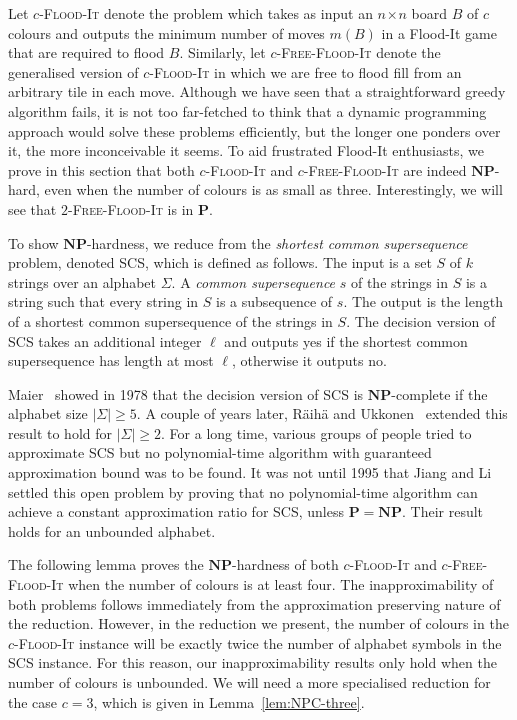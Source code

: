 \documentclass[a4paper,11pt]{llncs}
\newcounter{l}
\renewcommand{\geq}{\geqslant}
\newcommand{\Ptime}{\ensuremath{\mathbf{P}}}
\newcommand{\NPtime}{\ensuremath{\mathbf{NP}}}
\newcommand{\Coloroid}[1]{$#1$-\textsc{Flood-It}}
\newcommand{\ColoroidFree}[1]{$#1$-\textsc{Free-Flood-It}}
\newcommand{\SCS}{\textsc{SCS}}
\newcommand{\recdim}[2]{$#1$$\mspace{1mu}$$\times$$\mspace{1mu}$$#2$}
\begin{document}
Let \Coloroid{c} denote the problem which takes as input an \recdim{n}{n} board $B$ of $c$ colours and outputs the minimum number of moves $m(B)$ in a Flood-It game that are required to flood $B$. Similarly, let \ColoroidFree{c} denote the generalised version of \Coloroid{c} in which we are free to flood fill from an arbitrary tile in each move. Although we have seen that a straightforward greedy algorithm fails, it is not too far-fetched to think that a dynamic programming approach would solve these problems efficiently, but the longer one ponders over it, the more inconceivable it seems. To aid frustrated Flood-It enthusiasts, we prove in this section that both \Coloroid{c} and \ColoroidFree{c} are indeed \NPtime-hard, even when the number of colours is as small as three. Interestingly, we will see that \ColoroidFree{2} is in \Ptime.

To show \NPtime-hardness, we reduce from the \emph{shortest common supersequence} problem, denoted \SCS{}, which is defined as follows. The input is a set $S$ of $k$ strings over an alphabet $\Sigma$. A \emph{common supersequence} $s$ of the strings in $S$ is a string such that every string in $S$ is a subsequence of $s$. The output is the length of a shortest common supersequence of the strings in $S$. The decision version of \SCS{} takes an additional integer $\ell$ and outputs yes if the shortest common supersequence has length at most $\ell$, otherwise it outputs no.

Maier~\cite{Mai1978:SCS} showed in 1978 that the decision version of \SCS{} is \NPtime-complete if the alphabet size $|\Sigma|\geq 5$. A couple of years later, R\"aih\"a and Ukkonen~\cite{RU1981:SCS} extended this result to hold for $|\Sigma|\geq 2$. For a long time, various groups of people tried to approximate \SCS{} but no polynomial-time algorithm with guaranteed approximation bound was to be found. It was not until 1995 that Jiang and Li~\cite{JM1995:SCS} settled this open problem by proving that no polynomial-time algorithm can achieve a constant approximation ratio for \SCS{}, unless $\Ptime=\NPtime$. Their result holds for an unbounded alphabet.

The following lemma proves the \NPtime-hardness of both \Coloroid{c} and \ColoroidFree{c} when the number of colours is at least four. The inapproximability of both problems follows immediately from the approximation preserving nature of the reduction. However, in the reduction we present, the number of colours in the \Coloroid{c} instance will be exactly twice the number of alphabet symbols in the \SCS{} instance. For this reason, our inapproximability results only hold when the number of colours is unbounded. We will need a more specialised reduction for the case $c=3$, which is given in Lemma~\ref{lem:NPC-three}.
\end{document}
